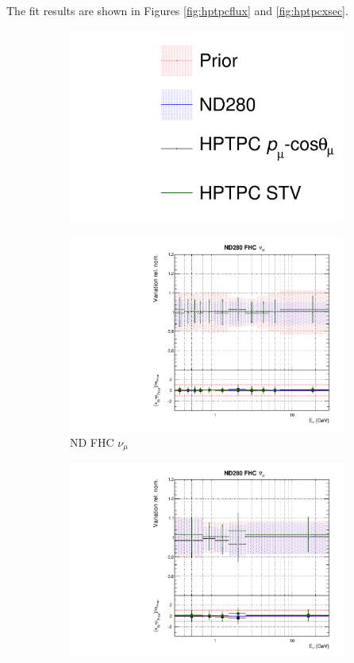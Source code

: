 The fit results are shown in Figures \ref{fig:hptpcflux} and \ref{fig:hptpcxsec}.

\begin{figure}[t]
\centering
\begin{subfigure}{0.95\textwidth}
  \centering
  \includegraphics[width=0.24\linewidth]{figs/hptpcfits_leg}	
\end{subfigure}
\begin{subfigure}{0.24\textwidth}
  \centering
  \includegraphics[width=0.95\linewidth]{figs/hptpcfitsflux_0}
  \caption{ND FHC $\nu_{\mu}$}
\end{subfigure}
\begin{subfigure}{0.24\textwidth}
  \centering
  \includegraphics[width=0.95\linewidth]{figs/hptpcfitsflux_1}

\end{subfigure}
\end{figure}
